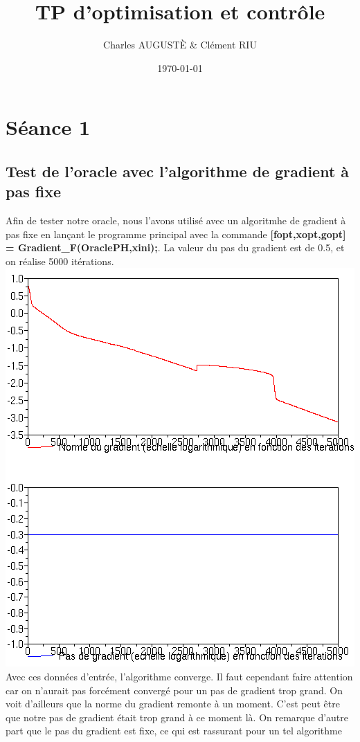 \documentclass[12pt, letterpaper]{article}
\title{TP d'optimisation et contrôle}
\author{Charles AUGUSTÈ \& Clément RIU}
\date{\today}
\begin{document}
\section*{Séance 1}

\subsection*{Test de l'oracle avec l'algorithme de gradient à pas fixe}
Afin de tester notre oracle, nous l'avons utilisé avec un algoritmhe de gradient à pas fixe en lançant le programme principal avec la commande \textbf{[fopt,xopt,gopt] = Gradient\_F(OraclePH,xini);}. La valeur du pas du gradient est de 0.5, et on réalise 5000 itérations. \\
\includegraphics[scale=0.5]{img1.png} \\
Avec ces données d'entrée, l'algorithme converge. Il faut cependant faire attention car on n'aurait pas forcément convergé pour un pas de gradient trop grand. On voit d'ailleurs que la norme du gradient remonte à un moment. C'est peut être que notre pas de gradient était trop grand à ce moment là. On remarque d'autre part que le pas du gradient est fixe, ce qui est rassurant pour un tel algorithme 
\end{document}
